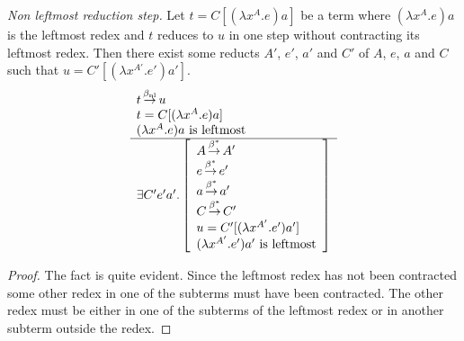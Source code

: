 \begin{theorem}
    \label{thm:NonLeftmostReduction}
    \emph{Non leftmost reduction step.}
    Let $t = C[(\lambda x^A. e)a]$ be a term where $(\lambda x^A.e)a$ is the
    leftmost redex and $t$ reduces to $u$ in one step without contracting its
    leftmost redex. Then there exist some reducts $A'$, $e'$, $a'$ and $C'$ of
    $A$, $e$, $a$ and $C$ such that $u = C'[(\lambda x^{A'}. e') a']$.
    $$
    \begin{array}{l} 
        t {\,\stackrel{{\beta_{\text{nl}}}}{\to}\,} u
        \\
        t = C[(\lambda x^A. e) a]
        \\
        (\lambda x^A. e) a \text{ is leftmost}
     \\ \hline 
        \exists C' e' a'. \left[ \begin{array}{l} 
            A {\,\stackrel{\beta^*}{\to}\,} A'
            \\
            e {\,\stackrel{\beta^*}{\to}\,} e'
            \\
            a {\,\stackrel{\beta^*}{\to}\,} a'
            \\
            C {\,\stackrel{\beta^*}{\to}\,} C'
            \\
            u = C'[(\lambda x^{A'}. e') a']
            \\
            (\lambda x^{A'}. e') a' \text{ is leftmost}
         \end{array} \right]
    \end{array}
    $$
    \begin{proof} The fact is quite evident. Since the leftmost redex has not
        been contracted some other redex in one of the subterms must have been
        contracted. The other redex must be either in one of the subterms of the
        leftmost redex or in another subterm outside the redex.
    \end{proof}
\end{theorem}




